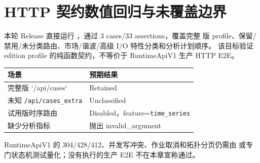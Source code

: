 \section{HTTP 契约数值回归与未覆盖边界}\label{sec:server-numerical}

本轮 Release 直接运行 ，通过 3 cases/33 assertions，覆盖完整
版 profile、保留/禁用/未分类路由、市场/谐波/高级 I/O 特性分类和分析计划顺序。
该目标验证 edition profile 的纯函数契约，不等价于 RuntimeApiV1 生产 HTTP E2E。

\begin{center}\small
\begin{tabular}{@{}L{6.5cm}L{5.0cm}@{}}
\toprule 场景 & 预期结果\\\midrule
完整版 `/api/cases` & Retained\\
未知 \texttt{/api/cases\_extra} & Unclassified\\
试用版时序路由 & Disabled，feature=\texttt{time\_series}\\
缺少分析指标 & 抛出 invalid\_argument\\
\bottomrule
\end{tabular}
\end{center}

RuntimeApiV1 的 304/428/412、并发写冲突、作业取消和拓扑分页仍需由
 或专门状态机测试量化；没有执行的生产 E2E 不在本章宣称通过。
